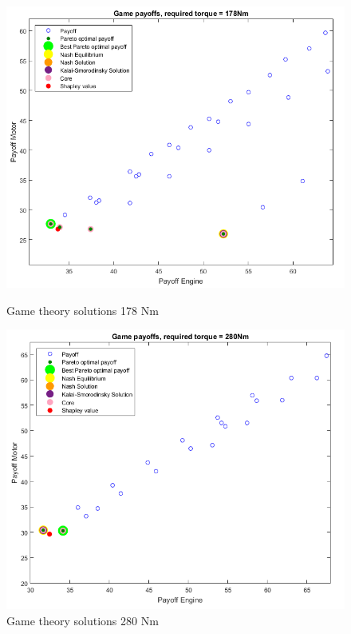 \begin{figure}[h]
\centering
\begin{minipage}{.5\textwidth}
 	\centering
	\includegraphics[scale=0.38]{figures/gametheory/178nm}
	\caption{Game theory solutions 178 Nm}
	\label{fig:178nm}
\end{minipage}%
\begin{minipage}{.5\textwidth}
  	\centering
	\includegraphics[scale=0.392]{figures/gametheory/280nm}
  	\caption{Game theory solutions 280 Nm}
  	\label{fig:280nm}
\end{minipage}
\end{figure}

